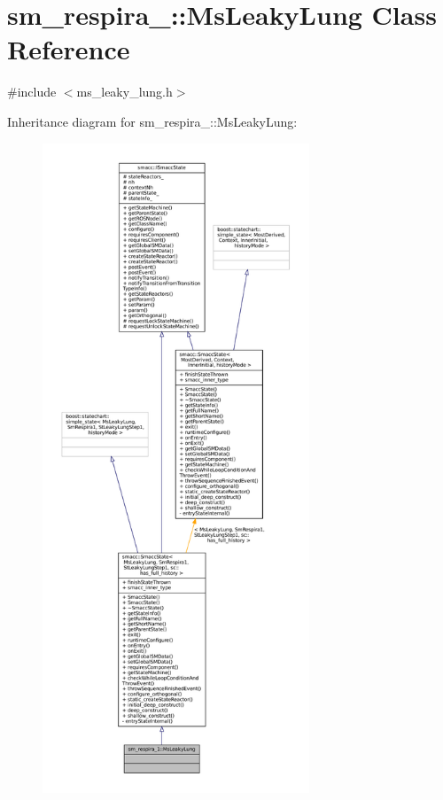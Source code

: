 \hypertarget{classsm__respira__1_1_1MsLeakyLung}{}\section{sm\+\_\+respira\+\_\+:\+:Ms\+Leaky\+Lung Class Reference}
\label{classsm__respira__1_1_1MsLeakyLung}


{\ttfamily \#include $<$ms\+\_\+leaky\+\_\+lung.\+h$>$}



Inheritance diagram for sm\+\_\+respira\+\_\+:\+:Ms\+Leaky\+Lung\+:
\nopagebreak
\begin{figure}[H]
\begin{center}
\leavevmode
\includegraphics[height=550pt]{classsm__respira__1_1_1MsLeakyLung__inherit__graph}
\end{center}
\end{figure}


